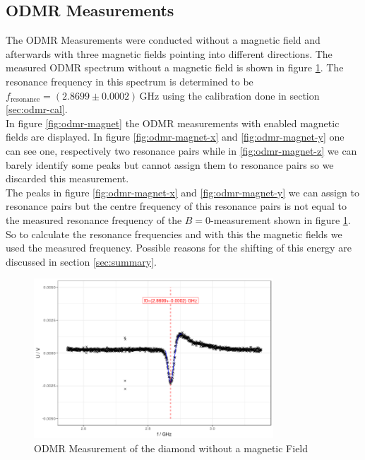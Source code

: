 \subsection{ODMR Measurements}

The ODMR Measurements were conducted without a magnetic field and afterwards with three magnetic fields pointing into different directions. The measured ODMR spectrum without a magnetic field is shown in figure \ref{fig:odmr-no-B}. The resonance frequency in this spectrum is determined to be $f_\text{resonance}=(2.8699\pm0.0002)\,\mathrm{GHz}$ using the calibration done in section \ref{sec:odmr-cal}.\\

In figure \ref{fig:odmr-magnet} the ODMR measurements with enabled magnetic fields are displayed. In figure \ref{fig:odmr-magnet-x} and \ref{fig:odmr-magnet-y} one can see one, respectively two resonance pairs while in \ref{fig:odmr-magnet-z} we can barely identify some peaks but cannot assign them to resonance pairs so we discarded this measurement.\\

The peaks in figure \ref{fig:odmr-magnet-x} and \ref{fig:odmr-magnet-y} we can assign to resonance pairs but the centre frequency of this resonance pairs is not equal to the measured resonance frequency of the $B=0$-measurement shown in figure \ref{fig:odmr-no-B}. So to calculate the resonance frequencies and with this the magnetic fields we used the measured frequency. Possible reasons for the shifting of this energy are discussed in section \ref{sec:summary}.

\begin{figure}
	\centering
	\includegraphics[width=0.8\textwidth]{../figures/odmr-1.png}
	\caption{ODMR Measurement of the diamond without a magnetic Field}
	\label{fig:odmr-no-B}
\end{figure}



